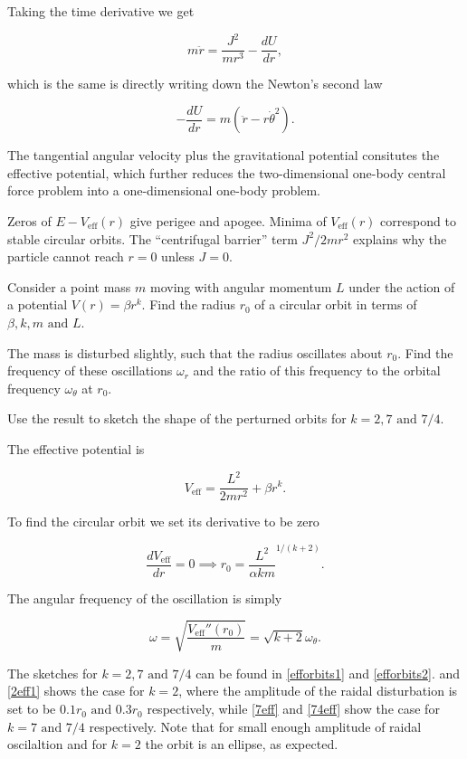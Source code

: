 \documentclass[a4paper,12pt]{report}
\begin{document}
Taking the time derivative we get 

\begin{equation}
	m \ddot{r} = \frac{J^2}{mr^3 } - \frac{dU}{dr},
\end{equation}

which is the same is directly writing down the Newton's second law 

\begin{equation}
	-\frac{dU}{dr} = m(\ddot{r} - r \dot{\theta }^2  ).
\end{equation}

The tangential angular velocity plus the gravitational potential consitutes the effective potential, which further reduces the two-dimensional one-body central force problem into a one-dimensional one-body problem. 

Zeros of \(E-V_{\text{eff} }(r)  \) give perigee and apogee. Minima of \(V_{\text{eff} }(r) \) correspond to stable circular orbits. The ``centrifugal barrier'' term \(J^2/2mr^2\) explains why the particle cannot reach \(r=0\) unless \(J=0\).      

{Consider a point mass \(m\) moving with angular momentum \(L\) under the action of a potential \(V(r) = \beta r^{k} \). Find the radius \(r_0 \) of a circular orbit in terms of \(\beta ,k, m \text { and } L\).

The mass is disturbed slightly, such that the radius oscillates about \(r_0\). Find
the frequency of these oscillations \(\omega _{r} \) and the ratio of this frequency to the orbital
frequency \(\omega _{\theta } \)  at \(r_0 \).

Use the result to sketch the shape of the perturned orbits for \(k = 2, 7 \text { and } 7/4\). }
{The effective potential is 

\begin{equation}
	V_{\text{eff} }  = \frac{L^2}{2mr^2} + \beta r^{k}. 
\end{equation}

To find the circular orbit we set its derivative to be zero 

\begin{equation}
	\frac{dV_{\text{eff} } }{dr} = 0 \implies r_0 = \frac{L^2}{\alpha km}^{1/(k+2)}.   
\end{equation}

The angular frequency of the oscillation is simply 

\begin{equation}
	\omega = \sqrt{\frac{V_{\text{eff} }''(r_0 ) }{m} } = \sqrt{k+2} \omega _{\theta }.   
\end{equation}

The sketches for \(k = 2, 7 \text { and } 7/4\) can be found in \cref{efforbits1} and \cref{efforbits2}.  and \cref{2eff1} shows the case for \(k = 2\), where the amplitude of the raidal disturbation is set to be \(0.1r_0 \text { and } 0.3r_0 \) respectively, while \cref{7eff} and \cref{74eff} show the case for \(k=7 \text { and } 7/4\) respectively. Note that for small enough amplitude of raidal oscilaltion and for \(k =2\) the orbit is an ellipse, as expected. 
} 
\end{document}
